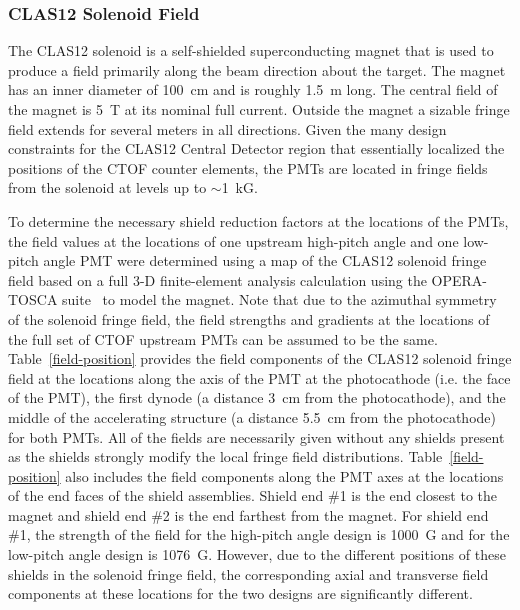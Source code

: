 \documentclass{elsart}
\begin{document}
\subsubsection{CLAS12 Solenoid Field}

The CLAS12 solenoid is a self-shielded superconducting magnet that is used to produce a field 
primarily along the beam direction about the target. The magnet has an inner diameter of 100~cm 
and is roughly 1.5~m long. The central field of the magnet is 5~T at its nominal full current. 
Outside the magnet a sizable fringe field extends for several meters in all directions. Given 
the many design constraints for the CLAS12 Central Detector region that essentially localized 
the positions of the CTOF counter elements, the PMTs are located in fringe fields from the 
solenoid at levels up to $\sim$1~kG.

To determine the necessary shield reduction factors at the locations of the PMTs, the field
values at the locations of one upstream high-pitch angle and one low-pitch angle PMT were
determined using a map of the CLAS12 solenoid fringe field based on a full 3-D 
finite-element analysis calculation using the OPERA-TOSCA suite~\cite{opera} to model the 
magnet. Note that due to the azimuthal symmetry of the solenoid fringe field, the field 
strengths and gradients at the locations of the full set of CTOF upstream PMTs can be assumed 
to be the same. Table~\ref{field-position} provides the field components of the CLAS12 
solenoid fringe field at the locations along the axis of the PMT at the photocathode (i.e. 
the face of the PMT), the first dynode (a distance 3~cm from the photocathode), and the middle 
of the accelerating structure (a distance 5.5~cm from the photocathode) for both PMTs. All of 
the fields are necessarily given without any shields present as the shields strongly modify the 
local fringe field distributions. Table~\ref{field-position} also includes the field components 
along the PMT axes at the locations of the end faces of the shield assemblies. Shield end \#1 
is the end closest to the magnet and shield end \#2 is the end farthest from the magnet. For 
shield end \#1, the strength of the field for the high-pitch angle design is 1000~G and for the 
low-pitch angle design is 1076~G. However, due to the different positions of these shields in 
the solenoid fringe field, the corresponding axial and transverse field components at these 
locations for the two designs are significantly different.
\end{document}
